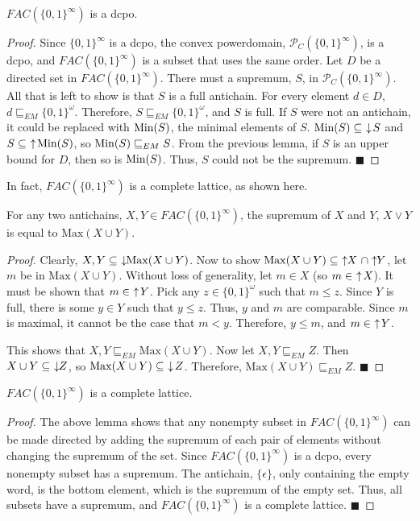 \begin{lemma}
$FAC(\{0,1\}^\infty)$ is a dcpo.
\end{lemma}
\begin{proof}
Since $\{0,1\}^\infty$  is a dcpo, the convex powerdomain, $\mathcal{P}_C(\{0,1\}^\infty)$, is a dcpo, and $FAC(\{0,1\}^\infty)$ is a subset that uses the same order.  Let $D$ be a directed set in $FAC(\{0,1\}^\infty)$.  There must a supremum, $S$, in $\mathcal{P}_C(\{0,1\}^\infty)$.  All that is left to show is that $S$ is a full antichain.  For every element $d\in D$, $d\sqsubseteq_{EM} \{0,1\}^{\omega}$. Therefore, $S\sqsubseteq_{EM} \{0,1\}^{\omega}$, and $S$ is full.  If $S$ were not an antichain, it could be replaced with $\textrm{Min}(S)$, the minimal elements of $S$.  $\textrm{Min}(S) \subseteq\, \,\downarrow\! S$ and $S \subseteq\, \,\uparrow\! \textrm{Min}(S)$, so $\textrm{Min}(S) \sqsubseteq_{EM} S$.  From the previous lemma, if $S$ is an upper bound for $D$, then so is $\textrm{Min}(S)$.  Thus, $S$ could not be the supremum. \hfill $\blacksquare$
\end{proof}
In fact, $FAC(\{0,1\}^\infty)$ is a complete lattice, as shown here.
\begin{lemma}\label{supantichains}
For any two antichains, $X,Y\in FAC(\{0,1\}^\infty)$, the supremum of $X$ and $Y$, $X \vee Y$ is equal to $\mathrm{Max}(X\cup Y)$.
\end{lemma}
\begin{proof}
Clearly, $X,Y\subseteq \,\,\downarrow\!\! \mathrm{Max}(X\cup Y)$.  Now to show $\mathrm{Max}(X\cup Y) \subseteq\, \,\uparrow\!\! X\ \cap\! \,\uparrow\!\! Y$, let $m$ be in $\mathrm{Max}(X\cup Y)$.  Without loss of generality, let $m\in X$ (so $m\in\, \,\uparrow\! X$).  It must be shown that $m\in\, \,\uparrow\! Y$.  Pick any $z\in \{0,1\}^{\omega}$ such that $m\leq z$.  Since $Y$ is full, there is some $y\in Y$ such that $y\leq z$.  Thus, $y$ and $m$ are comparable.  Since $m$ is maximal, it cannot be the case that $m < y$.  Therefore, $y\leq m$, and $m\in\, \,\uparrow\! Y$.

This shows that $X,Y\sqsubseteq_{EM} \mathrm{Max}(X\cup Y)$.  Now let $X,Y\sqsubseteq_{EM} Z$.  Then $X\cup Y\subseteq\, \,\downarrow\!\! Z$, so $\mathrm{Max}(X\cup Y) \subseteq\, \,\downarrow\! Z$.  Therefore, $\mathrm{Max}(X\cup Y) \sqsubseteq_{EM} Z$.  \hfill $\blacksquare$
\end{proof}

\begin{proposition}
$FAC(\{0,1\}^\infty)$ is a complete lattice.
\end{proposition}
\begin{proof}
The above lemma shows that any nonempty subset in $FAC(\{0,1\}^\infty)$ can be made directed by adding the supremum of each pair of elements without changing the supremum of the set.  Since $FAC(\{0,1\}^\infty)$ is a dcpo, every nonempty subset has a supremum.  The antichain, $\{\epsilon\}$, only containing the empty word, is the bottom element, which is the supremum of the empty set.  Thus, all subsets have a supremum, and $FAC(\{0,1\}^\infty)$ is a complete lattice. \hfill $\blacksquare$
\end{proof}

